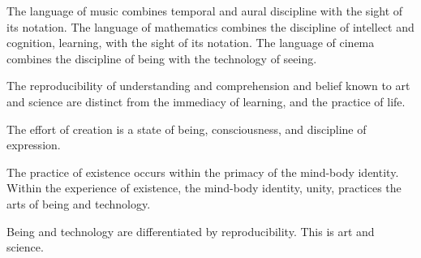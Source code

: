 

The language of music combines temporal and aural discipline with the
sight of its notation.  The language of mathematics combines the
discipline of intellect and cognition, learning, with the sight of its
notation.  The language of cinema combines the discipline of being
with the technology of seeing.  

The reproducibility of understanding and comprehension and belief
known to art and science are distinct from the immediacy of learning,
and the practice of life.

The effort of creation is a state of being, consciousness, and
discipline of expression.

The practice of existence occurs within the primacy of the mind-body
identity.  Within the experience of existence, the mind-body identity,
unity, practices the arts of being and technology.

Being and technology are differentiated by reproducibility.  This is
art and science.



\bye
